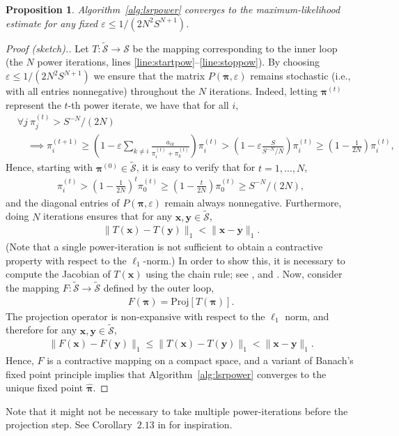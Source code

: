 \documentclass[12pt,a4paper,oneside]{article}
\theoremstyle{plain}
\newtheorem{proposition}{Proposition}
\begin{document}
\begin{proposition}
Algorithm~\ref{alg:lsrpower} converges to the maximum-likelihood estimate for any fixed $\varepsilon \le 1 / (2N^2S^{N+1})$.
\end{proposition}

\begin{proof}[Proof (sketch).]
Let $T : \widetilde{\mathcal{S}} \to \mathcal{S}$ be the mapping corresponding to the inner loop (the $N$ power iterations, lines \ref{line:startpow}--\ref{line:stoppow}).
By choosing $\varepsilon \le 1 / (2N^2S^{N+1})$ we ensure that the matrix $P(\bm{\pi}, \varepsilon)$ remains stochastic (i.e., with all entries nonnegative) throughout the $N$ iterations.
Indeed, letting $\bm{\pi}^{(t)}$ represent the $t$-th power iterate, we have that for all $i$,
\begin{align*}
&\forall j \ \pi_j^{(t)} > S^{-N}/(2N) \\
&\quad \implies
\pi_i^{(t+1)} \ge \left( 1 - \varepsilon \sum_{k \ne i} \frac{a_{ik}}{\pi_i^{(t)} + \pi_k^{(t)}} \right) \pi_i^{(t)} > \left( 1 - \varepsilon \frac{S}{S^{-N}/N} \right) \pi_i^{(t)} \ge \left( 1 - \frac{1}{2N} \right) \pi_i^{(t)},
\end{align*}
Hence, starting with $\bm{\pi}^{(0)} \in \widetilde{\mathcal{S}}$, it is easy to verify that for $t = 1, \ldots, N$,
\begin{align*}
\pi_i^{(t)} > \left( 1 - \frac{1}{2N} \right)^t \pi_0^{(t)} \ge \left( 1 - \frac{t}{2N} \right) \pi_0^{(t)} \ge S^{-N}/(2N),
\end{align*}
and the diagonal entries of $P(\bm{\pi}, \varepsilon)$ remain always nonnegative.
Furthermore, doing $N$ iterations ensures that for any $\bm{x}, \bm{y} \in \widetilde{\mathcal{S}}$,
\begin{align}
\lVert T(\bm{x}) - T(\bm{y}) \rVert_1 < \lVert \bm{x} - \bm{y} \rVert_1.
\end{align}
(Note that a single power-iteration is not sufficient to obtain a contractive property with respect to the $\ell_1$-norm.)
In order to show this, it is necessary to compute the Jacobian of $T(\bm{x})$ using the chain rule;
see \citet[Lemma~$2.17$]{olver2015nonlinear}, \citet[Theorem~$2$]{petersdorff2014fixed} and \citet{tresch2007convergence}.
Now, consider the mapping $F : \widetilde{\mathcal{S}} \to \widetilde{\mathcal{S}}$ defined by the outer loop,
\begin{align*}
F(\bm{\pi}) = \text{Proj}[T(\bm{\pi})].
\end{align*}
The projection operator is non-expansive with respect to the $\ell_1$ norm, and therefore for any $\bm{x}, \bm{y} \in \widetilde{\mathcal{S}}$,
\begin{align*}
\lVert F(\bm{x}) - F(\bm{y}) \rVert_1 \le \lVert T(\bm{x}) - T(\bm{y}) \rVert_1 < \lVert \bm{x} - \bm{y} \rVert_1.
\end{align*}
Hence, $F$ is a contractive mapping on a compact space, and a variant of Banach's fixed point principle \citep[Theorem~2.6]{kirk2001contraction} implies that Algorithm~\ref{alg:lsrpower} converges to the unique fixed point $\hat{\bm{\pi}}$.
\end{proof}

Note that it might not be necessary to take multiple power-iterations before the projection step.
See Corollary~$2.13$ in \citet{olver2015nonlinear} for inspiration.



\end{document}
